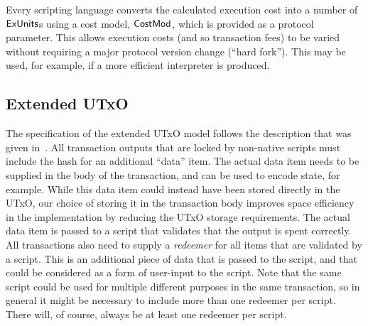 Every scripting language
converts the calculated execution cost into a number of $\mathsf{ExUnits}$s using a cost model,
$\mathsf{CostMod}$, which is provided as a protocol parameter.
This allows execution costs (and so transaction fees) to be varied without requiring a major protocol version change (``hard fork'').
This may be used, for example, if a more efficient interpreter is produced.

\subsection{Extended UTxO}

The specification of the extended UTxO model follows the description that was given in~\cite{plutus_eutxo}.
All transaction outputs that are locked by non-native scripts must include the hash for an additional ``data'' item.  The actual data item needs to be supplied in the body of the transaction,   and can be used to encode state, for example.
While this data item could instead have been stored directly in the UTxO, our choice of storing it in the transaction body improves space efficiency in the implementation by reducing the UTxO storage requirements. The actual data item is passed to a script that validates that the output is spent correctly.
All transactions also need to supply a \emph{redeemer} for all items that are validated by a script.  This is an additional piece of data that is passed to the script, and that could be considered as a form of user-input to the script. Note that the same script could be used for multiple different purposes in the same transaction, so in general it might be necessary to include more than one redeemer per script.
There will, of course, always be at least one redeemer per script.  
